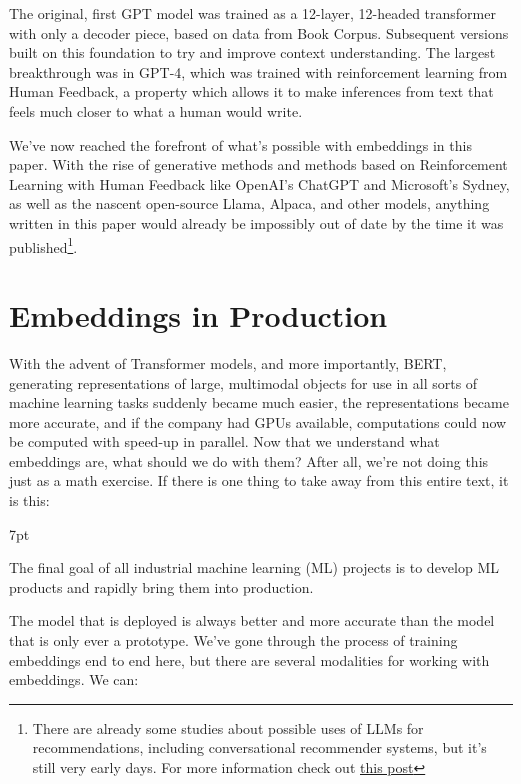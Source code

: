 \documentclass[11pt, table]{diazessay} %
\newenvironment{formal}{%
  \def\FrameCommand{%
	\hspace{1pt}%
	{\color{w_lightblue}\vrule width 2pt}%
	{\color{formalshade}\vrule width 4pt}%
	\colorbox{formalshade}%
  }%
  \MakeFramed{\advance\hsize-\width\FrameRestore}%
  \noindent\hspace{-4.55pt}%
  \begin{adjustwidth}{}{7pt}%
  \vspace{2pt}\vspace{2pt}%
}
{%
  \vspace{2pt}\end{adjustwidth}\endMakeFramed%
}
\begin{document}
\begin{sloppypar}
The original, first GPT model was trained as a 12-layer, 12-headed transformer with only a decoder piece, based on data from Book Corpus. Subsequent versions built on this foundation to try and improve context understanding. The largest breakthrough was in GPT-4, which was trained with reinforcement learning from Human Feedback, a property which allows it to make inferences from text that feels much closer to what a human would write.

We've now reached the forefront of what's possible with embeddings in this paper. With the rise of generative methods and methods based on Reinforcement Learning with Human Feedback like OpenAI's ChatGPT and Microsoft's Sydney, as well as the nascent open-source Llama, Alpaca, and other models,  anything written in this paper would already be impossibly out of date by the time it was published\footnote{There are already some studies about possible uses of LLMs for recommendations, including conversational recommender systems, but it's still very early days. For more information check out \href{https://blog.reachsumit.com/posts/2023/05/tuning-llm-for-recsys/}{this post}}.

\section{Embeddings in Production}

With the advent of Transformer models, and more importantly, BERT, generating representations of large, multimodal objects for use in all sorts of machine learning tasks suddenly became much easier, the representations became more accurate, and if the company had GPUs available, computations could now be computed with speed-up in parallel. Now that we understand what embeddings are, what should we do with them? After all, we're not doing this just as a math exercise. If there is one thing to take away from this entire text, it is this: 

\begin{formal}
The final goal of all industrial machine learning (ML) projects is to develop ML products and rapidly bring them into production.\citep{kreuzberger2022machine}
\end{formal}

The model that is deployed is always better and more accurate than the model that is only ever a prototype. We've gone through the process of training embeddings end to end here, but there are several modalities for working with embeddings. We can:


\end{sloppypar}
\end{document}
